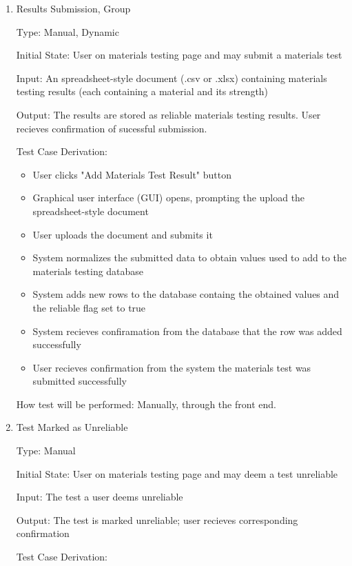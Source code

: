 \documentclass[12pt, titlepage]{article}
\begin{document}
\begin{enumerate}

\item{Results Submission, Group\\}

Type: Manual, Dynamic
					
Initial State: User on materials testing page and may submit a materials test
					
Input: An spreadsheet-style document (.csv or .xlsx) containing materials testing results (each containing a material and its strength)
					
Output: The results are stored as reliable materials testing results. User recieves confirmation of sucessful submission.

Test Case Derivation: 

\begin{itemize}
  \item User clicks "Add Materials Test Result" button
  \item Graphical user interface (GUI) opens, prompting the upload the spreadsheet-style document
  \item User uploads the document and submits it
  \item System normalizes the submitted data to obtain values used to add to the materials testing database
  \item System adds new rows to the database containg the obtained values and the reliable flag set to true
  \item System recieves confiramation from the database that the row was added successfully
  \item User recieves confirmation from the system the materials test was submitted successfully
\end{itemize}

How test will be performed: Manually, through the front end. 

\item{Test Marked as Unreliable}

Type: Manual
					
Initial State: User on materials testing page and may deem a test unreliable
					
Input: The test a user deems unreliable
					
Output: The test is marked unreliable; user recieves corresponding confirmation

Test Case Derivation: 


\end{enumerate}
\end{document}
